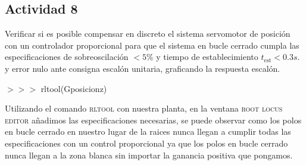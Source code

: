 \subsection{Actividad 8}
Verificar si es posible compensar en discreto el sistema
servomotor de posición con un controlador proporcional para que el
sistema en bucle cerrado cumpla las especificaciones de
sobreoscilación $< 5 \%$ y tiempo de establecimiento $t_{\text{est}} < 0.3 s$. y
error nulo ante consigna escalón unitaria, graficando la respuesta
escalón.

\begin{tcolorbox}[sharp corners, colframe=bluebox, title= Compensador
  proporcional en tiempo discreto.]
  $>>>$ rltool(Gposicionz)\\
  \vspace*{0.35em}

\end{tcolorbox}%

Utilizando el comando \textsc{rltool} con nuestra planta, en la
ventana \textsc{root locus editor} añadimos las especificaciones
necesarias, se puede observar como los polos en bucle cerrado en
nuestro lugar de la raices nunca llegan a cumplir todas las
especificaciones con un control proporcional ya que los polos en bucle
cerrado nunca llegan a la zona blanca sin importar la ganancia
positiva que pongamos.
